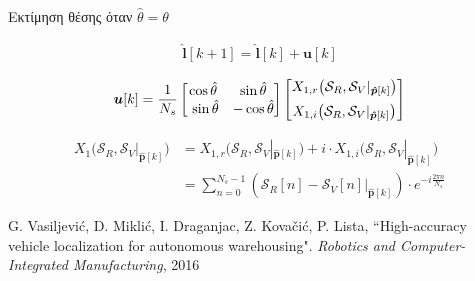 \begin{frame}{Εκτίμηση θέσης όταν $\hat{\theta} = \theta$}

  \begin{align}
    \hat{\bm{l}}[k+1] = \hat{\bm{l}}[k] + \bm{u}[k] \nonumber
  \end{align}

  \begin{align}
    \bm{u}[k] = \dfrac{1}{N_s}
    \begin{bmatrix}
      \cos\hat{\theta} & \sin\hat{\theta} \\\
      \sin\hat{\theta} & - \cos\hat{\theta}
    \end{bmatrix}
    \begin{bmatrix}
      X_{1,r}\big(\mathcal{S}_R, \mathcal{S}_V|_{\bm{\hat{p}}[k]}\big) \vspace{0.2cm} \\
      X_{1,i}\big(\mathcal{S}_R, \mathcal{S}_V|_{\bm{\hat{p}}[k]}\big)
    \end{bmatrix} \nonumber
  \end{align}

  \begin{align}
    X_1\big(\mathcal{S}_R, \mathcal{S}_V|_{\bm{\hat{p}}[k]}\big) &= X_{1,r}\big(\mathcal{S}_R, \mathcal{S}_V|_{\bm{\hat{p}}[k]}\big)
      + i \cdot X_{1,i}\big(\mathcal{S}_R, \mathcal{S}_V|_{\bm{\hat{p}}[k]}\big) \nonumber \\
      &= \sum\limits_{n=0}^{N_s-1}(\mathcal{S}_R[n] - \mathcal{S}_V[n]|_{\bm{\hat{p}}[k]}) \cdot e^{-i \frac{2 \pi n}{N_s}} \nonumber
  \end{align}

  \placebottom
  \tiny G. Vasiljević, D. Miklić, I. Draganjac, Z. Kovačić, P. Lista, ``High-accuracy vehicle localization for autonomous warehousing". \textit{Robotics and Computer-Integrated Manufacturing}, 2016

\end{frame}
